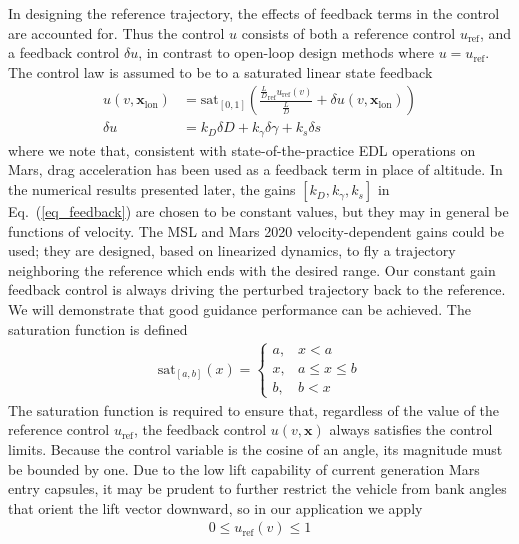 \documentclass[journal ]{new-aiaa}
\newcommand{\state}{\ensuremath{\mathbf{x}}}
\newcommand{\ur}{\ensuremath{u_{\mathrm{ref}}}}
\begin{document}
In designing the reference trajectory, the effects of feedback terms in the control are accounted for. Thus the control $u$ consists of both a reference control $\ur$, and a feedback control $\delta u$, in contrast to open-loop design methods where $u=\ur$. 
The control law is assumed to be to a saturated linear state feedback 
\begin{align}
u(v,\state_{\mathrm{lon}}) &= \mathrm{sat}_{[0,1]}\left(\frac{\frac{L}{D}_{\mathrm{ref}}\ur(v)}{\frac{L}{D}} + \delta u(v,\state_{\mathrm{lon}})\right) \label{eq_control}\\
\delta u &= k_D\delta D + k_{\gamma}\delta\gamma + k_s\delta s \label{eq_feedback}
\end{align}
where we note that, consistent with state-of-the-practice EDL operations on Mars, drag acceleration has been used as a feedback term in place of altitude. 
In the numerical results presented later, the gains $[k_D, k_{\gamma}, k_s]$ in Eq.~(\ref{eq_feedback}) are chosen to be constant values, but they may in general be functions of velocity. 
The MSL and Mars 2020 velocity-dependent gains could be used; they are designed, based on linearized dynamics, to fly a trajectory neighboring the reference which ends with the desired range. Our constant gain feedback control is always driving the perturbed trajectory back to the reference. We will demonstrate that good guidance performance can be achieved. %
The saturation function is defined
\begin{align*}
\mathrm{sat}_{[a,b]}(x) = \left\{\begin{array}{lc}
        a, &  x < a\\
        x, &  a\le x \le b\\
        b, &  b < x
        \end{array} \right. %
\end{align*}
The saturation function is required to ensure that, regardless of the value of the reference control \ur, the feedback control $u(v,\state)$ always satisfies the control limits. Because the control variable is the cosine of an angle, its magnitude must be bounded by one. Due to the low lift capability of current generation Mars entry capsules, it may be prudent to further restrict the vehicle from bank angles that orient the lift vector downward, so in our application we apply
\begin{align}
	0 \le \ur(v) \le 1 \label{eq_control_bounds}
\end{align}
\end{document}
